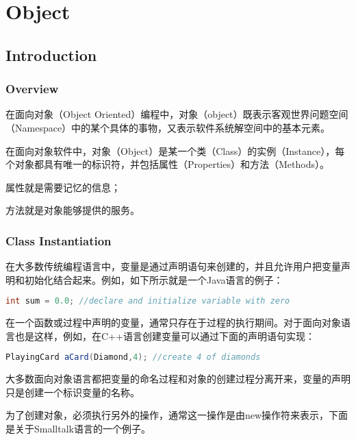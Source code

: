 \part{Object}


\chapter{Introduction}


\section{Overview}

在面向对象（Object Oriented）编程中，对象（object）既表示客观世界问题空间（Namespace）中的某个具体的事物，又表示软件系统解空间中的基本元素。

在面向对象软件中，对象（Object）是某一个类（Class）的实例（Instance），每个对象都具有唯一的标识符，并包括属性（Properties）和方法（Methods）。

\begin{compactitem}
\item 属性就是需要记忆的信息；
\item 方法就是对象能够提供的服务。
\end{compactitem}

\section{Class Instantiation}


在大多数传统编程语言中，变量是通过声明语句来创建的，并且允许用户把变量声明和初始化结合起来。例如，如下所示就是一个Java语言的例子：


\begin{lstlisting}[language=Java]
int sum = 0.0; //declare and initialize variable with zero
\end{lstlisting}

在一个函数或过程中声明的变量，通常只存在于过程的执行期间。对于面向对象语言也是这样，例如，在C++语言创建变量可以通过下面的声明语句实现：



\begin{lstlisting}[language=Java]
PlayingCard aCard(Diamond,4); //create 4 of diamonds
\end{lstlisting}

大多数面向对象语言都把变量的命名过程和对象的创建过程分离开来，变量的声明只是创建一个标识变量的名称。

为了创建对象，必须执行另外的操作，通常这一操作是由new操作符来表示，下面是关于Smalltalk语言的一个例子。

